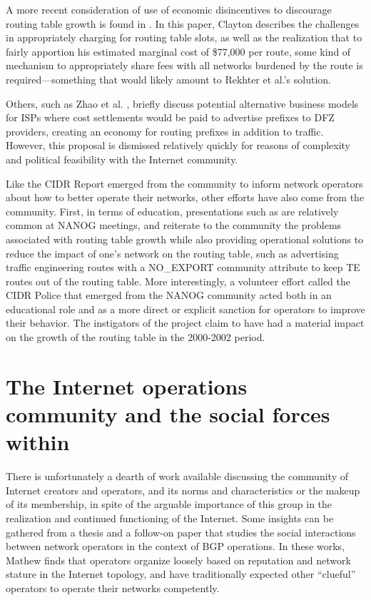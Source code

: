 A more recent consideration of use of economic disincentives to discourage
routing table growth is found in \cite{Clayton:2010bh}. In this paper, Clayton
describes the challenges in appropriately charging for routing table slots, as
well as the realization that to fairly apportion his estimated marginal cost of
\$77,000 per route, some kind of mechanism to appropriately share fees with all
networks burdened by the route is required---something that would likely amount
to Rekhter et al.'s solution.

Others, such as Zhao et al. \cite{Zhao:2001ly}, briefly discuss potential
alternative business models for ISPs where cost settlements would be paid to
advertise prefixes to DFZ providers, creating an economy for routing prefixes
in addition to traffic. However, this proposal is dismissed relatively quickly
for reasons of complexity and political feasibility with the Internet
community.

Like the CIDR Report emerged from the community to inform network operators
about how to better operate their networks, other efforts have also come from
the community. First, in terms of education, presentations such as
\cite{Steenbergen:2010nx} are relatively common at NANOG meetings, and
reiterate to the community the problems associated with routing table growth
while also providing operational solutions to reduce the impact of one's
network on the routing table, such as advertising traffic engineering
routes with a NO\_EXPORT community attribute to keep TE routes out of the
routing table.  More interestingly, a volunteer effort called the CIDR
Police \cite{Nussbacher:2003ys} that emerged from the NANOG community acted
both in an educational role and as a more direct or explicit sanction for
operators to improve their behavior. The instigators of the project claim
to have had a material impact on the growth of the routing table in the
2000-2002 period.

\section{The Internet operations community and the social forces within}

There is unfortunately a dearth of work available discussing the community of
Internet creators and operators, and its norms and characteristics or the
makeup of its membership, in spite of the arguable importance of this group in
the realization and continued functioning of the Internet. Some insights can be
gathered from a thesis \cite{Mathew:2009dz} and a follow-on paper
\cite{Mathew:2010ly} that studies the social interactions between network
operators in the context of BGP operations. In these works, Mathew finds that
operators organize loosely based on reputation and network stature in the
Internet topology, and have traditionally expected other ``clueful'' operators
to operate their networks competently.

